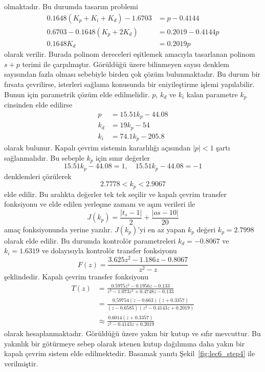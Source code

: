 olmaktadır. Bu durumda tasarım problemi
\begin{equation}
    \begin{split}
        0.1648(K_p+K_i+K_d)-1.6703&= p- 0.4144\\
        0.6703-0.1648(K_p+2K_d)&=0.2019 - 0.4144p\\
        0.1648K_d&=0.2019p
    \end{split}
\end{equation}
olarak verilir. Burada polinom dereceleri eşitlemek amacıyla tasarlanan polinom $s+p$ terimi ile çarpılmıştır. Görüldüğü üzere bilinmeyen sayısı denklem sayısından fazla olması sebebiyle birden çok çözüm bulunmaktadır. Bu durum bir fırsata çevrilirse, isterleri sağlama konusunda bir eniyileştirme işlemi yapılabilir. Bunun için parametrik çözüm elde edilmelidir. $p$, $k_d$ ve $k_i$ kalan parametre $k_p$ cinsinden elde edilirse 
\begin{equation}
    \begin{split}
        p&=15.51k_p-44.08\\
        k_d&=19k_p-54\\
        k_i&=74.1k_p-205.8
    \end{split}
\end{equation}
olarak bulunur. Kapalı çevrim sistemin kararlılığı açısından $|p|<1$ şartı sağlanmalıdır. Bu sebeple $k_p$ için sınır değerler
\begin{equation}
    15.51k_p-44.08=1,\quad 15.51k_p-44.08=-1
\end{equation}
denklemleri çözülerek 
\begin{equation}
    2.7778<k_p<2.9067
\end{equation}
elde edilir. Bu aralıkta değerler tek tek seçilir ve kapalı çevrim transfer fonksiyonu ve elde edilen yerleşme zamanı ve aşım verileri ile 
\begin{equation}
    J(k_p)=\frac{|t_s-1|}{2}+\frac{|os-10|}{20}
\end{equation}
amaç fonksiyonunda yerine yazılır. $J(k_p)$'yi en az yapan $k_p$ değeri $k_p=2.7998$ olarak elde edilir. Bu durumda kontrolör parametreleri $k_d=-0.8067$ ve $k_i=1.6319$ ve dolayısıyla kontrolör transfer fonksiyonu
\begin{equation}
    F(z)=\frac{3.625 z^2 - 1.186 z - 0.8067}{ z^2 - z}
\end{equation}
şeklindedir. Kapalı çevrim transfer fonksiyonu 
\begin{equation}
\begin{split}
    T(z)&=\frac{0.5975 z^2 - 0.1956 z - 0.133}{z^3 - 1.073 z^2 + 0.4748 z - 0.133}\\
    &=\frac{0.59754 (z-0.663) (z+0.3357)}{(z-0.6585) (z^2 - 0.4143z + 0.2019)}\\
    &\approx\frac{0.6014(z+0.3357)}{z^2 - 0.4143z + 0.2019}
\end{split}
\end{equation}
olarak hesaplanmaktadır. Görüldüğü üzere yakın bir kutup ve sıfır mevcuttur. Bu yakınlık bir götürmeye sebep olarak istenen kutup dağılımına daha yakın bir kapalı çevrim sistem elde edilmektedir. Basamak yanıtı Şekil~\ref{fig:lec6_step4} ile verilmiştir.

